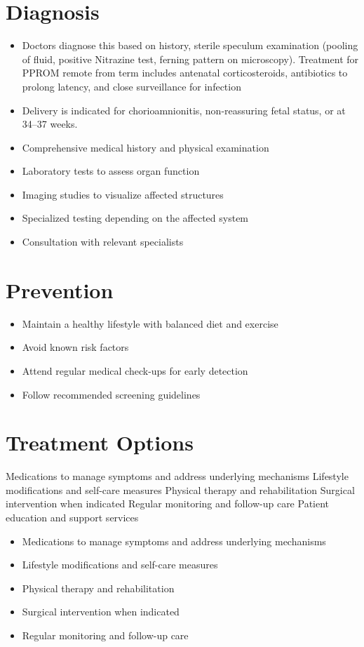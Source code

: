\section{Diagnosis}
\begin{itemize}[noitemsep]
  \item Doctors diagnose this based on history, sterile speculum examination (pooling of fluid, positive Nitrazine test, ferning pattern on microscopy). Treatment for PPROM remote from term includes antenatal corticosteroids, antibiotics to prolong latency, and close surveillance for infection
  \item Delivery is indicated for chorioamnionitis, non-reassuring fetal status, or at 34--37 weeks.
  \item Comprehensive medical history and physical examination
  \item Laboratory tests to assess organ function
  \item Imaging studies to visualize affected structures
  \item Specialized testing depending on the affected system
  \item Consultation with relevant specialists
\end{itemize}
\section{Prevention}
\begin{itemize}[noitemsep]
  \item Maintain a healthy lifestyle with balanced diet and exercise
  \item Avoid known risk factors
  \item Attend regular medical check-ups for early detection
  \item Follow recommended screening guidelines
\end{itemize}
\section{Treatment Options}
Medications to manage symptoms and address underlying mechanisms Lifestyle modifications and self-care measures Physical therapy and rehabilitation Surgical intervention when indicated Regular monitoring and follow-up care Patient education and support services

\begin{itemize}[noitemsep]
  \item Medications to manage symptoms and address underlying mechanisms
  \item Lifestyle modifications and self-care measures
  \item Physical therapy and rehabilitation
  \item Surgical intervention when indicated
  \item Regular monitoring and follow-up care
\end{itemize}
